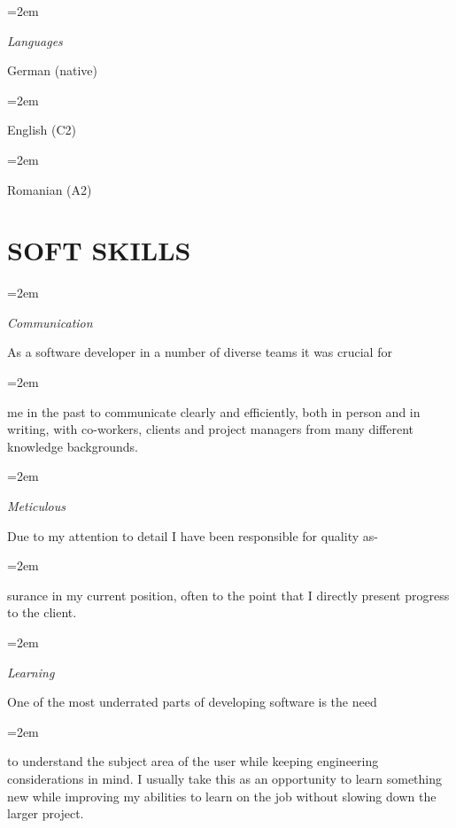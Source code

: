 \documentclass[paper=a4,fontsize=11pt]{scrartcl} %
\newlength{\spacebox}
\newcommand{\sepspace}{\vspace*{1em}}		%
\newcommand{\NewPart}[1]{\section*{\uppercase{#1}}}
\newcommand{\PersonalEntry}[2]{
		\noindent\hangindent=2em\hangafter=0 %
		\parbox{\spacebox}{        %
		\textit{#1}}		       %
		\hspace{1.5em} #2 \par}    %
\newcommand{\SkillsEntry}[2]{      %
		\noindent\hangindent=2em\hangafter=0 %
		\parbox{\spacebox}{        %
		\textit{#1}}			   %
		\hspace{1.5em} \parbox{6\spacebox}{#2} \par}    %
\begin{document}
\SkillsEntry{Languages}{German (native)}
\SkillsEntry{}{English (C2)}
\SkillsEntry{}{Romanian (A2)}
\sepspace


\NewPart{Soft Skills}{}

\SkillsEntry{Communication}{As a software developer in a number of diverse teams it was crucial for }
\vspace{3pt}
\SkillsEntry{}{me in the past to communicate clearly and efficiently, both in person and in writing, with co-workers, clients and project managers from many different knowledge backgrounds.}
\sepspace

\SkillsEntry{Meticulous}{Due to my attention to detail I have been responsible for quality as-}
\vspace{3pt}
\SkillsEntry{}{surance in my current position, often to the point that I directly present progress to the client.}
\sepspace


\SkillsEntry{Learning}{One of the most underrated parts of developing software is the need }
\vspace{3pt}
\SkillsEntry{}{to understand the subject area of the user while keeping engineering considerations in mind. I usually take this as an opportunity to learn something new while improving my abilities to learn on the job without slowing down the larger project.}
\sepspace

\end{document}
